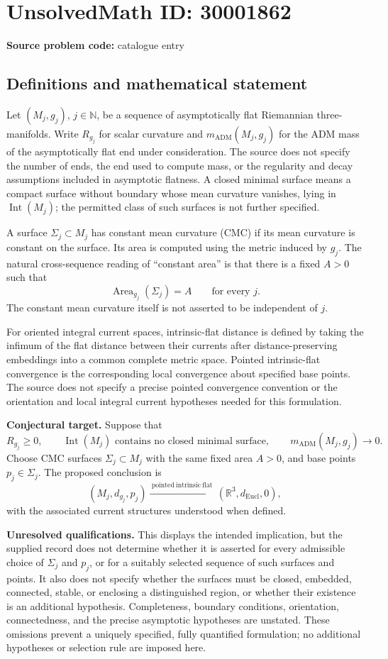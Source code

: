 \documentclass[11pt]{article}
\newcommand{\N}{\mathbb{N}}
\newcommand{\R}{\mathbb{R}}
\begin{document}
\section*{UnsolvedMath ID: 30001862}
\textbf{Source problem code:} catalogue entry
\subsection{Definitions and mathematical statement}
Let \((M_j,g_j)\), \(j\in\N\), be a sequence of asymptotically flat Riemannian three-manifolds. Write \(R_{g_j}\) for scalar curvature and \(m_{\mathrm{ADM}}(M_j,g_j)\) for the ADM mass of the asymptotically flat end under consideration. The source does not specify the number of ends, the end used to compute mass, or the regularity and decay assumptions included in asymptotic flatness. A closed minimal surface means a compact surface without boundary whose mean curvature vanishes, lying in \(\operatorname{Int}(M_j)\); the permitted class of such surfaces is not further specified.

A surface \(\Sigma_j\subset M_j\) has constant mean curvature (CMC) if its mean curvature is constant on the surface. Its area is computed using the metric induced by \(g_j\). The natural cross-sequence reading of ``constant area'' is that there is a fixed \(A>0\) such that
\[
\operatorname{Area}_{g_j}(\Sigma_j)=A\qquad\text{for every }j.
\]
The constant mean curvature itself is not asserted to be independent of \(j\).

For oriented integral current spaces, intrinsic-flat distance is defined by taking the infimum of the flat distance between their currents after distance-preserving embeddings into a common complete metric space. Pointed intrinsic-flat convergence is the corresponding local convergence about specified base points. The source does not specify a precise pointed convergence convention or the orientation and local integral current hypotheses needed for this formulation.

\textbf{Conjectural target.} Suppose that
\[
R_{g_j}\geq 0,\qquad
\operatorname{Int}(M_j)\text{ contains no closed minimal surface},\qquad
m_{\mathrm{ADM}}(M_j,g_j)\longrightarrow 0.
\]
Choose CMC surfaces \(\Sigma_j\subset M_j\) with the same fixed area \(A>0\), and base points \(p_j\in\Sigma_j\). The proposed conclusion is
\[
(M_j,d_{g_j},p_j)\xrightarrow{\ \mathrm{pointed\ intrinsic\ flat}\ }
(\R^3,d_{\mathrm{Eucl}},0),
\]
with the associated current structures understood when defined.

\textbf{Unresolved qualifications.} This displays the intended implication, but the supplied record does not determine whether it is asserted for every admissible choice of \(\Sigma_j\) and \(p_j\), or for a suitably selected sequence of such surfaces and points. It also does not specify whether the surfaces must be closed, embedded, connected, stable, or enclosing a distinguished region, or whether their existence is an additional hypothesis. Completeness, boundary conditions, orientation, connectedness, and the precise asymptotic hypotheses are unstated. These omissions prevent a uniquely specified, fully quantified formulation; no additional hypotheses or selection rule are imposed here.
\end{document}
